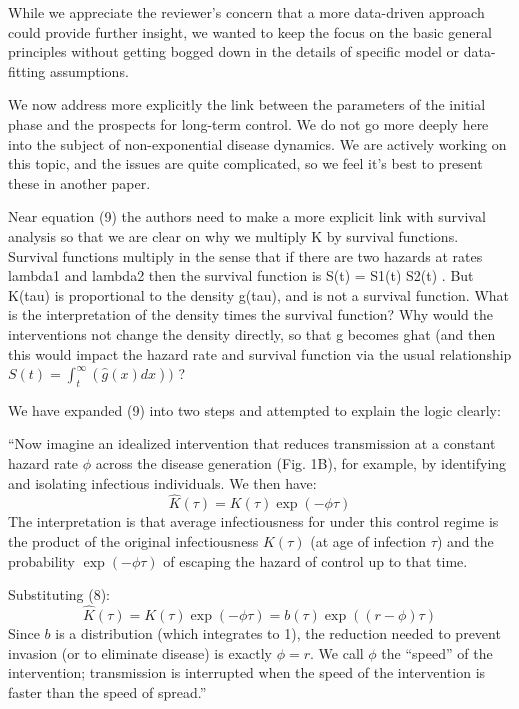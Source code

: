 \documentclass[12pt]{article}
\newcommand{\revtext}{\textsf}
\begin{document}
While we appreciate the reviewer's concern that a more data-driven approach could provide further insight, we wanted to keep the focus on the basic general principles without getting bogged down in the details of specific model or data-fitting assumptions. 

We now address more explicitly the link between the parameters of the
initial phase and the prospects for long-term control. 
We do not go more deeply here into the subject of non-exponential disease dynamics. 
We are actively working on this topic, and the issues are quite complicated, so we feel it's best to present these in another paper.

\revtext{Near equation (9) the authors need to make a more explicit link with
survival analysis so that we are clear on why we multiply K by survival
functions. Survival functions multiply in the sense that if there are
two hazards at rates lambda1 and lambda2 then the survival function is
S(t) = S1(t) S2(t) . But K(tau) is proportional to the density g(tau),
and is not a survival function. What is the interpretation of the
density times the survival function? Why would the interventions not
change the density directly, so that g becomes ghat (and then this would
impact the hazard rate and survival function via the usual relationship
$S(t) = \int_t ^\infty ( \hat{g} (x) dx )  )$ ?}

We have expanded (9) into two steps and attempted to explain the logic clearly:

``Now imagine an idealized intervention that reduces transmission at a constant hazard rate $\phi$ across the disease generation (Fig. 1B), for example, by identifying and isolating infectious individuals.
We then have:
\begin{equation}
	\hat K(\tau) = K(\tau)\exp(-\phi\tau)
\end{equation}
The interpretation is that average infectiousness for under this control regime is the product of the original infectiousness $K(\tau)$ (at age of infection $\tau$) and the probability $\exp(-\phi\tau)$ of escaping the hazard of control up to that time.

Substituting (8):
\begin{equation}
	\hat K(\tau) = K(\tau)\exp(-\phi\tau) = b(\tau)\exp((r-\phi)\tau)
\end{equation}
Since $b$ is a distribution (which integrates to 1), the reduction needed to prevent invasion (or to eliminate disease) is exactly $\phi=r$. 
We call $\phi$ the ``speed'' of the intervention; transmission is interrupted when the speed of the intervention is faster than the speed of spread.''
\end{document}
